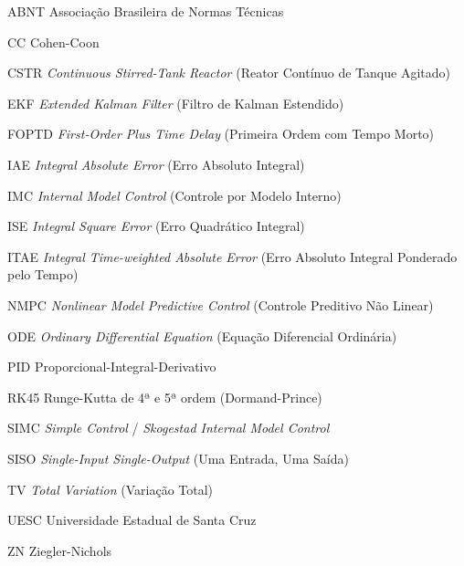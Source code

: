 \documentclass[
	12pt,
	oneside,
	a4paper,
	chapter=TITLE,
	section=TITLE,
	english,
	brazilian
]{abntex2}
\begin{document}
\begin{siglas}
    \item[ABNT] Associação Brasileira de Normas Técnicas
    \item[CC] Cohen-Coon
    \item[CSTR] \textit{Continuous Stirred-Tank Reactor} (Reator Contínuo de Tanque Agitado)
    \item[EKF] \textit{Extended Kalman Filter} (Filtro de Kalman Estendido)
    \item[FOPTD] \textit{First-Order Plus Time Delay} (Primeira Ordem com Tempo Morto)
    \item[IAE] \textit{Integral Absolute Error} (Erro Absoluto Integral)
    \item[IMC] \textit{Internal Model Control} (Controle por Modelo Interno)
    \item[ISE] \textit{Integral Square Error} (Erro Quadrático Integral)
    \item[ITAE] \textit{Integral Time-weighted Absolute Error} (Erro Absoluto Integral Ponderado pelo Tempo)
    \item[NMPC] \textit{Nonlinear Model Predictive Control} (Controle Preditivo Não Linear)
    \item[ODE] \textit{Ordinary Differential Equation} (Equação Diferencial Ordinária)
    \item[PID] Proporcional-Integral-Derivativo
    \item[RK45] Runge-Kutta de 4ª e 5ª ordem (Dormand-Prince)
    \item[SIMC] \textit{Simple Control} / \textit{Skogestad Internal Model Control}
    \item[SISO] \textit{Single-Input Single-Output} (Uma Entrada, Uma Saída)
    \item[TV] \textit{Total Variation} (Variação Total)
    \item[UESC] Universidade Estadual de Santa Cruz
    \item[ZN] Ziegler-Nichols
\end{siglas}
\cleardoublepage

\tableofcontents*
\cleardoublepage

\textual
\OnehalfSpacing
\pagestyle{abnttextual}










\postextual
\SingleSpacing


\end{document}
